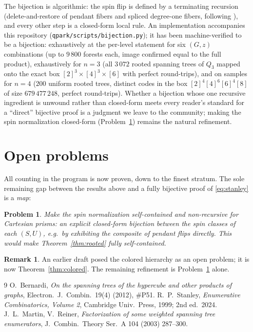 \documentclass[11pt]{amsart}
\newtheorem{problem}[theorem]{Problem}
\theoremstyle{definition}
\newtheorem{remark}[theorem]{Remark}
\begin{document}
The bijection is algorithmic: the spin flip is defined by a terminating
recursion (delete-and-restore of pendant fibers and spliced degree-one
fibers, following \cite{bernardi}), and every other step is a closed-form
local rule. An implementation accompanies this repository
(\texttt{qpark/scripts/bijection.py}); it has been machine-verified to be a
bijection: exhaustively at the per-level statement for six $(G, z)$
combinations (up to $9\,800$ forests each, image confirmed equal to the
full product), exhaustively for $n = 3$ (all $3\,072$ rooted spanning trees
of $Q_3$ mapped onto the exact box $[2]^3\times[4]^3\times[6]$ with perfect
round-trips), and on samples for $n = 4$ ($200$ uniform rooted trees,
distinct codes in the box $[2]^4[4]^6[6]^4[8]$ of size $679\,477\,248$,
perfect round-trips). Whether a bijection whose one recursive ingredient is
unwound rather than closed-form meets every reader's standard for a
``direct'' bijective proof is a judgment we leave to the community; making
the spin normalization closed-form (Problem~\ref{prob:main}) remains the
natural refinement.

\section{Open problems}

All counting in the program is now proven, down to the finest stratum. The
sole remaining gap between the results above and a fully bijective proof of
\eqref{eq:stanley} is a \emph{map}:

\begin{problem}\label{prob:main}
Make the spin normalization self-contained and non-recursive for Cartesian
prisms: an explicit closed-form bijection between the spin classes of each
$(S,U)$, e.g.\ by exhibiting the composite of pendant flips directly. This
would make Theorem~\ref{thm:rooted} fully self-contained.
\end{problem}

\begin{remark}
An earlier draft posed the colored hierarchy as an open problem; it is now
Theorem~\ref{thm:colored}. The remaining refinement is
Problem~\ref{prob:main} alone.
\end{remark}

\begin{thebibliography}{9}
 O.~Bernardi, \emph{On the spanning trees of the
hypercube and other products of graphs}, Electron.\ J.\ Combin.\ 19(4)
(2012), \#P51.
 R.~P.~Stanley, \emph{Enumerative Combinatorics, Volume 2},
Cambridge Univ.\ Press, 1999; 2nd ed.\ 2024.
 J.~L.~Martin, V.~Reiner, \emph{Factorization of some weighted
spanning tree enumerators}, J.\ Combin.\ Theory Ser.~A 104 (2003) 287--300.
\end{thebibliography}
\end{document}

